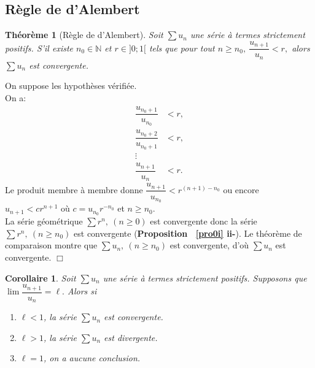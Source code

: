 \documentclass[11pt, a4paper]{book}
\newtheorem{teo}{Th\'eor\`eme}[section]
\newtheorem{cor}{Corollaire}[section]
\newenvironment{pr}{\noindent {\bf Preuve} \noindent} {\hfill $\Box$\vskip 5mm}
\begin{document}
\subsection{R\`egle de d'Alembert}
\begin{teo}[R\`egle de d'Alembert] \label{teo2.1.1.1} Soit $\sum u_n$ une s\'erie \`a termes strictement positifs. S'il existe $n_0 \in \mathbb{N}$ et $r \in ]0;1[$ tels que pour tout $n\geq n_0,~ \dfrac{u_{n+1}}{u_n} < r,$ alors $\sum u_n$ est convergente. \end{teo}
\begin{pr}\quad On suppose les hypoth\`eses v\'erifi\'ee.\\
On a:\begin{align*}\dfrac{u_{n_{0}+1}}{u_{n_{0}}}  &< r,\\
\dfrac{u_{n_{0}+2}}{u_{n_{0}+1}} &<r,\\ \vdots &   \\
\dfrac{u_{n+1}}{u_n}  &<  r.\end{align*}
 Le produit membre \`a membre donne $\dfrac{u_{n+1}}{u_{n_{0}}}<r^{(n+1)-n_{0}}$ ou encore $u_{n+1}<c r^{n+1}$ o\`u $c=u_{n_{0}}r^{-n_{0}}$ et $n\geq n_0.$\\ La s\'erie g\'eom\'etrique $\sum r^n,~(n\geq 0)$ est convergente donc la s\'erie $\sum r^n,~(n\geq n_0)$ est convergente (\textbf{Proposition ~\ref{pro0i} ii-}). Le th\'eor\`eme de comparaison montre que $\sum u_n,~ (n\geq n_0)$ est convergente, d'o\`u $\sum u_n$ est convergente.
\end{pr}
\begin{cor} \label{cor2.1.1.1} Soit $\sum u_n$ une s\'erie \`a termes strictement positifs. Supposons que ${\displaystyle \lim \dfrac{u_{n+1}}{u_n}=\ell.}$ Alors si \begin{enumerate}
\item[*] $\ell<1$, la s\'erie $\sum u_n$ est convergente.
\item[*] $\ell>1$, la s\'erie $\sum u_n$ est divergente.
\item[*] $\ell=1$, on a aucune conclusion. 
\end{enumerate} \end{cor}
\end{document}
